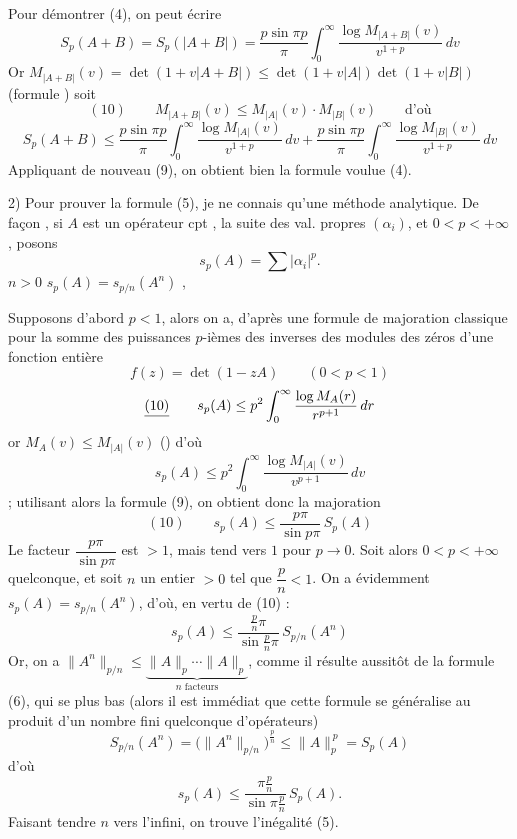 \documentclass[11pt,a4paper]{article}
\begin{document}
Pour démontrer (4), on  peut écrire
\[
  S_p(A + B) = S_p(|A + B|) = \frac{p \sin \pi p}{\pi} \int_0^\infty \frac{\log M_{|A+B|}(v)}{v^{1+p}}\, dv
\]
Or $M_{|A+B|}(v) = \det(1 + v|A + B|) \leq \det(1 + v|A|)\det(1 + v|B|)$ (formule \ill{})  soit
\[
  (10)\qquad M_{|A+B|}(v) \leq M_{|A|}(v) \cdot M_{|B|}(v) \qquad \text{d'où}
\]
\[
  S_p(A + B) \leq \frac{p \sin \pi p}{\pi} \int_0^\infty \frac{\log M_{|A|}(v)}{v^{1+p}}\, dv + \frac{p \sin \pi p}{\pi} \int_0^\infty \frac{\log M_{|B|}(v)}{v^{1+p}}\, dv
\]
Appliquant de nouveau (9), on obtient bien la formule voulue (4).


2) Pour prouver la formule (5), je ne connais qu'une méthode analytique. De façon , si $A$ est un opérateur cpt ,  la suite des val. propres $(\alpha_i)$,  et  $0 < p < +\infty$, posons
\[
  s_p(A) = \sum |\alpha_i|^p.
\]
\struck{\ill{}}     $n > 0$  \quad $s_p(A) = s_{p/n}(A^n)$  ,

Supposons d'abord $p < 1$, alors on a, d'après une formule de majoration classique pour la somme des puissances $p$-ièmes des inverses des modules des zéros d'une fonction entière
\[
  f(z) = \det(1 - zA) \qquad (0 < p < 1)
\]
\[
  \struck{(10)}\qquad s_p(A) \leq p^2 \int_0^\infty \frac{\log M_A(r)}{r^{p+1}}\, dr
\]
or $M_A(v) \leq M_{|A|}(v)$ (\ill{}) d'où
\[
  s_p(A) \leq p^2 \int_0^\infty \frac{\log M_{|A|}(v)}{v^{p+1}}\, dv
\]
; utilisant alors la formule (9), on obtient donc la majoration
\[
  (10)\qquad s_p(A) \leq \frac{p\pi}{\sin p\pi}\, S_p(A)
\]
Le facteur $\dfrac{p\pi}{\sin p\pi}$ est $> 1$, mais tend vers $1$ pour $p \to 0$. Soit alors $0 < p < +\infty$ quelconque, et soit $n$ un entier $> 0$ tel que $\dfrac{p}{n} < 1$. On a évidemment $s_p(A) = s_{p/n}(A^n)$, d'où, en vertu de (10) :
\[
  s_p(A) \leq \frac{\frac{p}{n}\pi}{\sin \frac{p}{n}\pi}\, S_{p/n}(A^n)
\]
Or, on a  $\|A^n\|_{p/n} \leq \underbrace{\|A\|_p \cdots \|A\|_p}_{n \text{ facteurs}}$, comme il résulte aussitôt de la formule (6), qui se  plus bas (alors il est immédiat que cette formule se généralise au produit d'un nombre fini quelconque d'opérateurs)
\[
  S_{p/n}(A^n) = \bigl(\|A^n\|_{p/n}\bigr)^{\frac{p}{n}} \leq \|A\|_p^{\,p} = S_p(A)
\]
d'où
\[
  s_p(A) \leq \frac{\pi \frac{p}{n}}{\sin \pi \frac{p}{n}}\, S_p(A).
\]
Faisant tendre $n$ vers l'infini, on trouve l'inégalité (5).
\end{document}
